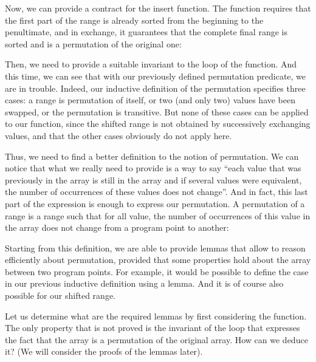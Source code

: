 


Now, we can provide a contract for the insert function. The function requires
that the first part of the range is already sorted from the beginning to the
penultimate, and in exchange, it guarantees that the complete final range is
sorted and is a permutation of the original one:






Then, we need to provide a suitable invariant to the loop of the
 function. And this time, we can see that with our
previously defined permutation predicate, we are in trouble.
Indeed, our inductive definition of the permutation specifies three cases: a
range is permutation of itself, or two (and only two) values have been swapped,
or the permutation is transitive. But none of these cases can be applied to our
 function, since the shifted range is not obtained by
successively exchanging values, and that the other cases obviously do not apply
here.



Thus, we need to find a better definition to the notion of permutation. We can
notice that what we really need to provide is a way to say ``each value that
was previously in the array is still in the array and if several values were
equivalent, the number of occurrences of these values does not change''. And in
fact, this last part of the expression is enough to express our permutation.
A permutation of a range is a range such that for all value, the number of
occurrences of this value in the array does not change from a program point to
another:






Starting from this definition, we are able to provide lemmas that allow to
reason efficiently about permutation, provided that some properties hold about
the array between two program points. For example, it would be possible to define
the case  in our previous inductive definition using a lemma.
And it is of course also possible for our shifted range.




Let us determine what are the required lemmas by first considering the
 function. The only property that is not proved is the
invariant of the loop that expresses the fact that the array is a permutation of
the original array. How can we deduce it? (We will consider the proofs of the
lemmas later).




